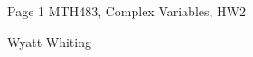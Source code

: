 \documentclass{article}
\begin{document}
\large %


{\Large Page 1 %
\hfill  MTH483, Complex Variables, HW2}

\begin{center}
{\Large Wyatt Whiting}
\end{center}
\vspace{0.05in}

\end{document}
